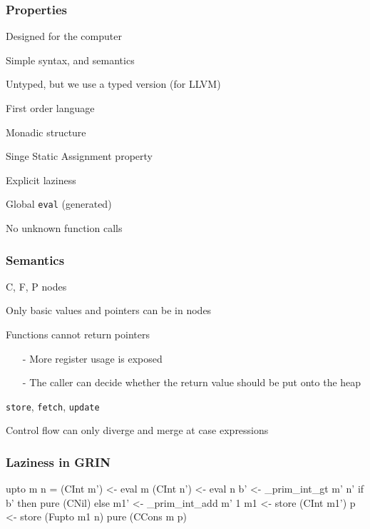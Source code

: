\documentclass[bigger]{beamer}
\begin{document}
\begin{frame}[fragile]
	\frametitle{Properties}
	
	\begin{vfitemize}
		\item Designed for the computer 
		\item Simple syntax, and semantics
		\item Untyped, but we use a typed version (for LLVM)
		\item First order language 
		\item Monadic structure 
		\item Singe Static Assignment property 
		\item Explicit laziness
		\item Global \texttt{eval} (generated)
		\item No unknown function calls
	\end{vfitemize}
\end{frame}



\begin{frame}
	\frametitle{Semantics}
	
	\begin{vfitemize}
		\item C, F, P nodes
		\item Only basic values and pointers can be in nodes
		\item Functions cannot return pointers
			\begin{itemize}
				\item[-] More register usage is exposed
				\item[-] The caller can decide whether the return value should be put onto the heap
			\end{itemize}
		\item \texttt{store},
				  \texttt{fetch},
				  \texttt{update}
		\item Control flow can only diverge and merge at case expressions
	\end{vfitemize}
\end{frame}

\begin{frame}[fragile]
	\frametitle{Laziness in GRIN}
		
	\begin{haskellcode}
    upto m n = 
      (CInt m') <- eval m
      (CInt n') <- eval n
      b' <- _prim_int_gt m' n'
      if b' then
        pure (CNil)
      else
        m1' <- _prim_int_add m' 1
        m1  <- store (CInt m1')
        p   <- store (Fupto m1 n)
        pure (CCons m p)
	\end{haskellcode}
	
\end{frame}
\end{document}
